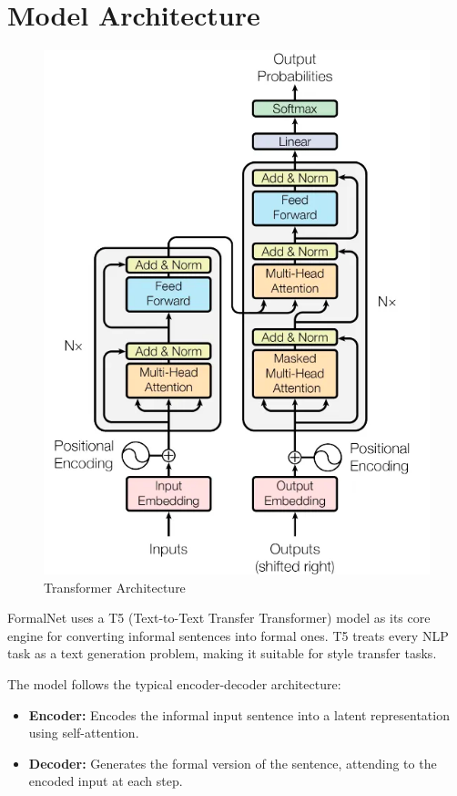 \section{Model Architecture}
\begin{figure}[H]
  \centering
  \includegraphics[width=1\textwidth]{images/transformer_architecture.png}
  \caption{Transformer Architecture}
  \label{fig:transformer}
\end{figure}
FormalNet uses a T5 (Text-to-Text Transfer Transformer) model as its core engine for converting informal sentences into formal ones. T5 treats every NLP task as a text generation problem, making it suitable for style transfer tasks.

The model follows the typical encoder-decoder architecture:
\begin{itemize}
  \item \textbf{Encoder:} Encodes the informal input sentence into a latent representation using self-attention.
  \item \textbf{Decoder:} Generates the formal version of the sentence, attending to the encoded input at each step.
\end{itemize}

